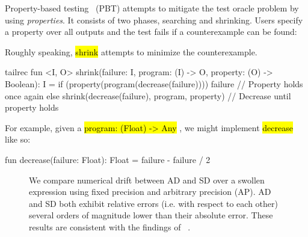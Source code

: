 \documentclass[12pt,initial,twoside,maitrise]{dms}
\newcommand{\inline}[1]{%
    \begingroup%
    \sethlcolor{slightgray}%
    \hl{\ttfamily\footnotesize #1}%
    \endgroup
}
\numberwithin{equation}{section}
\numberwithin{table}{chapter}
\numberwithin{figure}{chapter}
\begin{document}
Property-based testing~\citep{fink1997property} (PBT) attempts to mitigate the test oracle problem by using \textit{properties}. It consists of two phases, searching and shrinking. Users specify a property over all outputs and the test fails if a counterexample can be found:
%
%
Roughly speaking, \inline{shrink} attempts to minimize the counterexample.
%
\begin{kotlinlisting}
tailrec fun <I, O> shrink(failure: I, program: (I) -> O, property: (O) -> Boolean): I =
    if (property(program(decrease(failure)))) failure // Property holds once again
    else shrink(decrease(failure), program, property) // Decrease until property holds
\end{kotlinlisting}
%
For example, given a \inline{program: (Float) -> Any}, we might implement \inline{decrease} like so:
%
\begin{kotlinlisting}
fun decrease(failure: Float): Float = failure - failure / 2
\end{kotlinlisting}
%
\begin{figure}
\caption{We compare numerical drift between AD and SD over a swollen expression using fixed precision and arbitrary precision (AP). AD and SD both exhibit relative errors (i.e. with respect to each other) several orders of magnitude lower than their absolute error. These results are consistent with the findings of ~\citet{laue2019equivalence}.\vspace{-10pt}}
\label{fig:pbt_comparison}
\end{figure}
\end{document}

